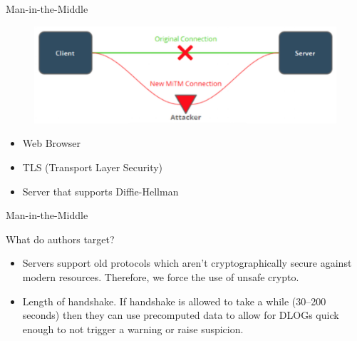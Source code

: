 \documentclass[presentation, aspectratio=54]{beamer}
\begin{document}
\begin{frame}{Man-in-the-Middle}

\begin{figure}
\centering
\includegraphics[width=0.86\columnwidth]{graphics/mitm.png}
\end{figure}

\begin{itemize}
\item Web Browser
\item TLS (Transport Layer Security)
\item Server that supports Diffie-Hellman
\end{itemize}
    
\end{frame}


\begin{frame}{Man-in-the-Middle}

What do authors target?
\begin{itemize}
\item Servers support old protocols which aren't cryptographically secure
      against modern resources. Therefore, we force the use of unsafe crypto.
\item Length of handshake. If handshake is allowed to take a while (30--200
      seconds) then they can use precomputed data to allow for DLOGs quick
      enough to not trigger a warning or raise suspicion.
\end{itemize}

\end{frame}

\end{document}
